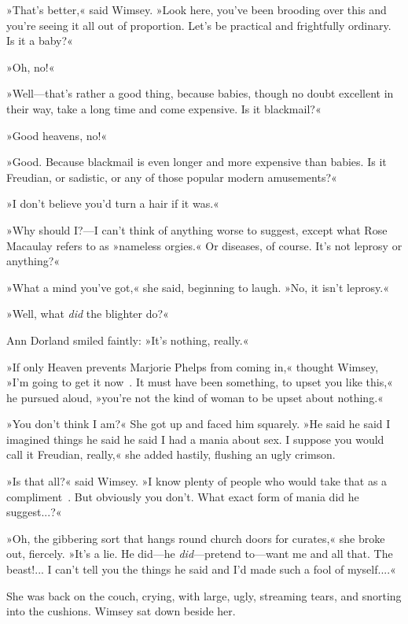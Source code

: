 »That's better,« said Wimsey. »Look here, you've been brooding over this and you're seeing it all out of proportion. Let's be practical and frightfully ordinary. Is it a baby?«

»Oh, no!«

»Well—that's rather a good thing, because babies, though no doubt excellent in their way, take a long time and come expensive. Is it blackmail?«

»Good heavens, no!«

»Good. Because blackmail is even longer and more expensive than babies. Is it Freudian, or sadistic, or any of those popular modern amusements?«

»I don't believe you'd turn a hair if it was.«

»Why should I?—I can't think of anything worse to suggest, except what Rose Macaulay refers to as »nameless orgies.« Or diseases, of course. It's not leprosy or anything?«

»What a mind you've got,« she said, beginning to laugh. »No, it isn't leprosy.«

»Well, what \textit{did} the blighter do?«

Ann Dorland smiled faintly: »It's nothing, really.«

»If only Heaven prevents Marjorie Phelps from coming in,« thought Wimsey, »I'm going to get it now\textellipsis~. It must have been something, to upset you like this,« he pursued aloud, »you're not the kind of woman to be upset about nothing.«

»You don't think I am?« She got up and faced him squarely. »He said \textellipsis  he said \textellipsis  I imagined things \textellipsis  he said \textellipsis  he said I had a mania about sex. I suppose you would call it Freudian, really,« she added hastily, flushing an ugly crimson.

»Is that all?« said Wimsey. »I know plenty of people who would take that as a compliment\textellipsis~. But obviously you don't. What exact form of mania did he suggest...?«

»Oh, the gibbering sort that hangs round church doors for curates,« she broke out, fiercely. »It's a lie. He did—he \textit{did}—pretend to—want me and all that. The beast!... I can't tell you the things he said \textellipsis  and I'd made such a fool of myself....«

She was back on the couch, crying, with large, ugly, streaming tears, and snorting into the cushions. Wimsey sat down beside her.

